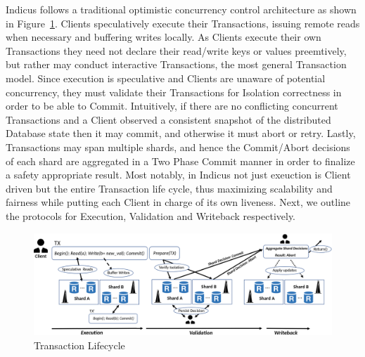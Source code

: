 Indicus follows a traditional optimistic concurrency control architecture as shown in Figure~\ref{fig:Figure1}. Clients speculatively execute their Transactions, issuing remote reads when necessary and buffering writes locally. As Clients execute their own Transactions they need not declare their read/write keys or values preemtively, but rather may conduct interactive Transactions, the most general Transaction model. Since execution is speculative and Clients are unaware of potential concurrency, they must validate their Transactions for Isolation correctness in order to be able to Commit. Intuitively, if there are no conflicting concurrent Transactions and a Client observed a consistent snapshot of the distributed Database state then it may commit, and otherwise it must abort or retry. Lastly, Transactions may span multiple shards, and hence the Commit/Abort decisions of each shard are aggregated in a Two Phase Commit manner in order to finalize a safety appropriate result. Most notably, in Indicus not just exeuction is Client driven but the entire Transaction life cycle, thus maximizing scalability and fairness while putting each Client in charge of its own liveness.
Next, we outline the protocols for Execution, Validation and Writeback respectively.

\begin{figure}[!th]
\begin{center}
\includegraphics[width= \textwidth]{./figures/Arch.png}
\end{center}
\caption{Transaction Lifecycle}
\label{fig:Figure1}
\end{figure}

